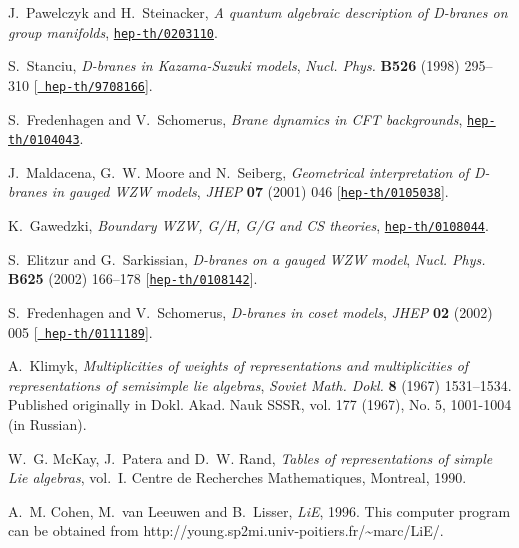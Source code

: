 \documentclass[12pt,a4paper]{article}
\begin{document}
\begin{thebibliography}{10}
J.~Pawelczyk and H.~Steinacker, {\it A quantum algebraic description of
  {D-branes} on group manifolds},
  \href{http://arXiv.org/abs/hep-th/0203110}{{\tt hep-th/0203110}}.

S.~Stanciu, {\it D-branes in {Kazama-Suzuki} models},  {\em Nucl. Phys.} {\bf
  B526} (1998) 295--310 [\href{http://arXiv.org/abs/hep-th/9708166}{{\tt
  hep-th/9708166}}].

S.~Fredenhagen and V.~Schomerus, {\it Brane dynamics in {CFT} backgrounds},
  \href{http://arXiv.org/abs/hep-th/0104043}{{\tt hep-th/0104043}}.

J.~Maldacena, G.~W. Moore and N.~Seiberg, {\it Geometrical interpretation of
  {D-branes} in gauged {WZW} models},  {\em JHEP} {\bf 07} (2001) 046
  [\href{http://arXiv.org/abs/hep-th/0105038}{{\tt hep-th/0105038}}].

K.~Gawedzki, {\it Boundary {WZW}, {G/H}, {G/G} and {CS} theories},
  \href{http://arXiv.org/abs/hep-th/0108044}{{\tt hep-th/0108044}}.

S.~Elitzur and G.~Sarkissian, {\it D-branes on a gauged {WZW} model},  {\em
  Nucl. Phys.} {\bf B625} (2002) 166--178
  [\href{http://arXiv.org/abs/hep-th/0108142}{{\tt hep-th/0108142}}].

S.~Fredenhagen and V.~Schomerus, {\it D-branes in coset models},  {\em JHEP}
  {\bf 02} (2002) 005 [\href{http://arXiv.org/abs/hep-th/0111189}{{\tt
  hep-th/0111189}}].

A.~Klimyk, {\it Multiplicities of weights of representations and multiplicities
  of representations of semisimple lie algebras},  {\em Soviet Math. Dokl.}
  {\bf 8} (1967) 1531--1534. Published originally in Dokl. Akad. Nauk SSSR,
  vol. 177 (1967), No. 5, 1001-1004 (in Russian).

W.~G. McKay, J.~Patera and D.~W. Rand, {\em Tables of representations of simple
  {Lie} algebras}, vol.~I.
\newblock Centre de Recherches Mathematiques, Montreal, 1990.

A.~M. Cohen, M.~van Leeuwen and B.~Lisser, {\it {LiE}},  1996.
\newblock This computer program can be obtained from
  http://young.sp2mi.univ-poitiers.fr/\textasciitilde marc/LiE/.


\end{thebibliography}
\end{document}
